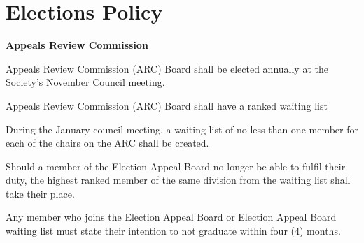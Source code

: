 \section{Elections Policy}
\begin{longenum}[ label*=\thesection.\arabic*., align=left]
 \item \textbf{Appeals Review Commission}
 \begin{longenum}[label*=\arabic*., align=left]
  \item Appeals Review Commission (ARC) Board shall be elected annually at the Society's November Council meeting.
  \item Appeals Review Commission (ARC) Board shall have a ranked waiting list
  \item  During the January council meeting, a waiting list of no less than one member for each of the chairs on the ARC shall be created.
  \item Should a member of the Election Appeal Board no longer be able to fulfil their duty, the highest ranked member of the same division from the waiting list shall take their place.
  \item Any member who joins the Election Appeal Board or Election Appeal Board waiting list must state their intention to not graduate within four (4) months.
  

\end{longenum}
\end{longenum}
